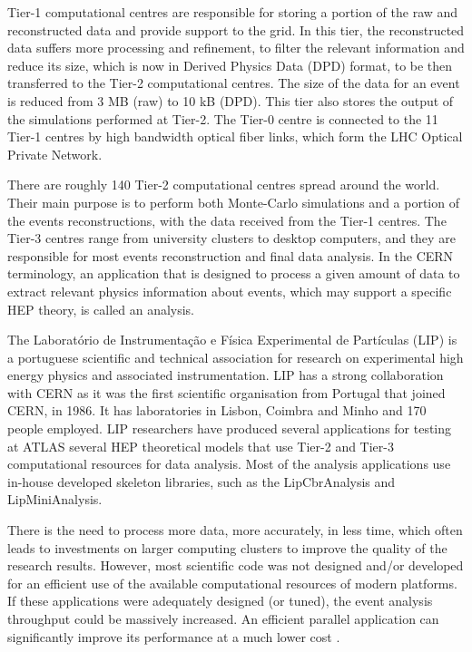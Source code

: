 Tier-1 computational centres are responsible for storing a portion of the raw and reconstructed data and provide support to the grid. In this tier, the reconstructed data suffers more processing and refinement, to filter the relevant information and reduce its size, which is now in Derived Physics Data (DPD) format, to be then transferred to the Tier-2 computational centres. The size of the data for an event is reduced from 3 MB (raw) to 10 kB (DPD). This tier also stores the output of the simulations performed at Tier-2. The Tier-0 centre is connected to the 11 Tier-1 centres by high bandwidth optical fiber links, which form the LHC Optical Private Network.

There are roughly 140 Tier-2 computational centres spread around the world. Their main purpose is to perform both Monte-Carlo simulations and a portion of the events reconstructions, with the data received from the Tier-1 centres. The Tier-3 centres range from university clusters to desktop computers, and they are responsible for most events reconstruction and final data analysis. In the CERN terminology, an application that is designed to process a given amount of data to extract relevant physics information about events, which may support a specific HEP theory, is called an analysis.

The Laboratório de Instrumentação e Física Experimental de Partículas (LIP) \cite{LIP} is a portuguese scientific and technical association for research on experimental high energy physics and associated instrumentation. LIP has a strong collaboration with CERN as it was the first scientific organisation from Portugal that joined CERN, in 1986. It has laboratories in Lisbon, Coimbra and Minho and 170 people employed. LIP researchers have produced several applications for testing at ATLAS several HEP theoretical models that use Tier-2 and Tier-3 computational resources for data analysis. Most of the analysis applications use in-house developed skeleton libraries, such as the LipCbrAnalysis and LipMiniAnalysis.

There is the need to process more data, more accurately, in less time, which often leads to investments on larger computing clusters to improve the quality of the research results. However, most scientific code was not designed and/or developed for an efficient use of the available computational resources of modern platforms. If these applications were adequately designed (or tuned), the event analysis throughput could be massively increased. An efficient parallel application can significantly improve its performance at a much lower cost \cite{Msc:AMP}.

